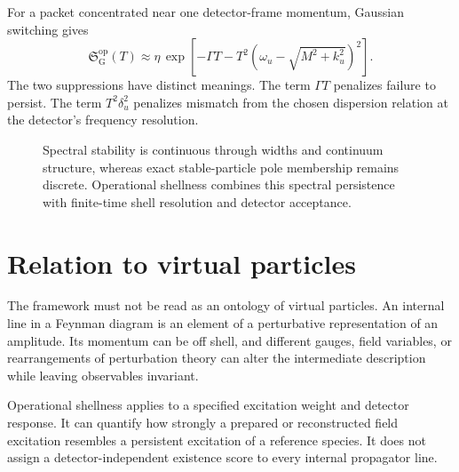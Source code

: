 \documentclass[11pt]{article}
\theoremstyle{remark}
\newcommand{\Sop}{\mathfrak S}
\begin{document}
For a packet concentrated near one detector-frame momentum, Gaussian switching gives
\begin{equation}
  \Sop^{\mathrm{op}}_{\mathrm G}(T)
  \approx\eta\,
  \exp\!\left[-\Gamma T
  -T^2\left(
  \omega_u-\sqrt{M^2+k_u^2}
  \right)^2\right].
  \label{eq:toy-score}
\end{equation}
The two suppressions have distinct meanings. The term $\Gamma T$ penalizes failure to persist. The term $T^2\delta_u^2$ penalizes mismatch from the chosen dispersion relation at the detector's frequency resolution.

\begin{figure}[t]
\centering
{}
\caption{Spectral stability is continuous through widths and continuum structure, whereas exact stable-particle pole membership remains discrete. Operational shellness combines this spectral persistence with finite-time shell resolution and detector acceptance.}
\label{fig:spectral-structures}
\end{figure}

\section{Relation to virtual particles}

The framework must not be read as an ontology of virtual particles. An internal line in a Feynman diagram is an element of a perturbative representation of an amplitude. Its momentum can be off shell, and different gauges, field variables, or rearrangements of perturbation theory can alter the intermediate description while leaving observables invariant.

Operational shellness applies to a specified excitation weight and detector response. It can quantify how strongly a prepared or reconstructed field excitation resembles a persistent excitation of a reference species. It does not assign a detector-independent existence score to every internal propagator line.
\end{document}
